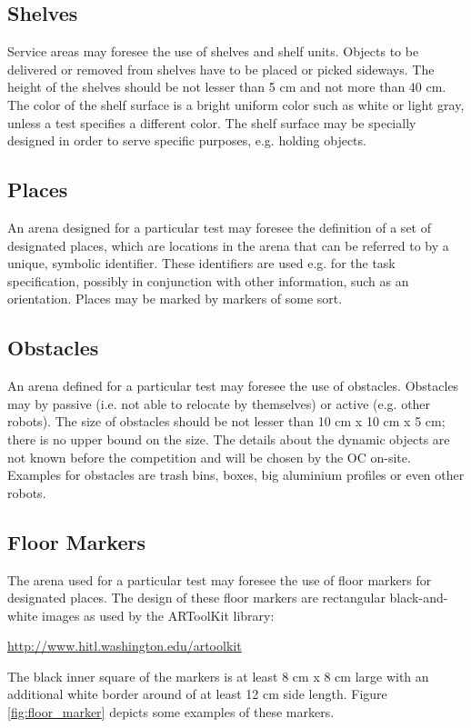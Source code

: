 \subsection{Shelves}
Service areas may foresee the use of shelves and shelf units. Objects to be delivered or removed from shelves have to be placed or picked sideways. The height of the shelves should be not lesser than 5 cm and not more than 40 cm. The color of the shelf surface is a bright uniform color such as white or light gray, unless a test specifies a different color. The shelf surface may be specially designed in order to serve specific purposes, e.g. holding objects.

\subsection{Places}
An arena designed for a particular test may foresee the definition of a set of designated places, which are locations in the arena that can be referred to by a unique, symbolic identifier. These identifiers are used e.g. for the task specification, possibly in conjunction with other information, such as an orientation. Places may be marked by markers of some sort.

\subsection{Obstacles}
An arena defined for a particular test may foresee the use of obstacles. Obstacles may by passive (i.e. not able to relocate by themselves) or active (e.g. other robots). The size of obstacles should be not lesser than 10 cm x 10 cm x 5 cm; there is no upper bound on the size. The details about the dynamic objects are not known before the competition and will be chosen by the OC on-site. Examples for obstacles are trash bins, boxes, big aluminium profiles or even other robots.

\subsection{Floor Markers}
The arena used for a particular test may foresee the use of floor markers for designated places. The design of these floor markers are rectangular black-and-white images as used by the ARToolKit library:

\url{http://www.hitl.washington.edu/artoolkit}

The black inner square of the markers is at least 8 cm x 8 cm large with an additional white border around of at least 12 cm side length. Figure \ref{fig:floor_marker} depicts some examples of these markers.

